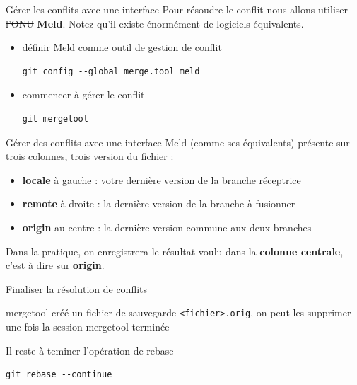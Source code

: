 \documentclass{beamer}
\begin{document}
\begin{frame}[fragile]{Gérer les conflits avec une interface}
	Pour résoudre le conflit nous allons utiliser \sout{l'ONU} \textbf{Meld}. Notez qu'il existe énormément de logiciels équivalents.
	
	\begin{itemize}
		\item définir Meld comme outil de gestion de conflit
		\begin{lstlisting}[frame=single]
		git config --global merge.tool meld 
		\end{lstlisting}
		
		\item commencer à gérer le conflit
		\begin{lstlisting}[frame=single]
		git mergetool
		\end{lstlisting}
	\end{itemize}
	
\end{frame}

\begin{frame}{Gérer des conflits avec une interface}
	Meld (comme ses équivalents) présente sur trois colonnes, trois version du fichier :
	\begin{itemize}
		\item \textbf{locale} à gauche : votre dernière version de la branche réceptrice
		\item \textbf{remote} à droite : la dernière version de la branche à fusionner
		\item \textbf{origin} au centre : la dernière version commune aux deux branches
	\end{itemize}
	\bigskip
	Dans la pratique, on enregistrera le résultat voulu dans la \textbf{colonne centrale}, c'est à dire sur \textbf{origin}.
\end{frame}

\begin{frame}[fragile]{Finaliser la résolution de conflits}

	mergetool créé un fichier de sauvegarde \texttt{<fichier>.orig}, on peut les supprimer une fois la session mergetool terminée
	\vfill{}
	
	Il reste à teminer l'opération de rebase
	\begin{lstlisting}[frame=single]
		git rebase --continue
	\end{lstlisting}	
	
\end{frame}
\end{document}
